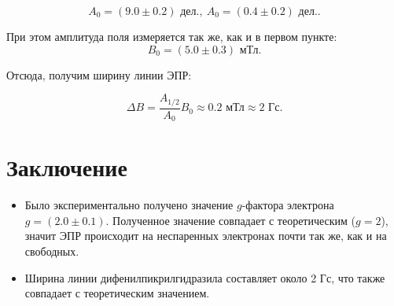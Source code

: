 \documentclass[a4paper, 12pt]{article}
\begin{document}
    $$
    A_0 = \left( 9.0 \pm 0.2 \right) \text{ дел.}, \: A_0 = \left( 0.4 \pm 0.2 \right) \text{ дел.}.
    $$
    
    При этом амплитуда поля измеряется так же, как и в первом пункте: 
    $$
    B_0 = \left(5.0 \pm 0.3 \right) \text{ мТл}.
    $$

    Отсюда, получим ширину линии ЭПР:

    $$
    \Delta B = \frac{A_{1/2}}{A_0} B_0 \approx 0.2 \text{ мТл} \approx 2 \text{ Гс}.
    $$
    
    \section{Заключение}
    
    \begin{itemize}
        \item Было экспериментально получено значение $g$-фактора электрона $g = \left( 2.0 \pm 0.1 \right)$. Полученное значение совпадает с теоретическим ($g = 2$), значит ЭПР происходит на неспаренных электронах почти так же, как и на свободных.

        \item Ширина линии дифенилпикрилгидразила составляет около 2 Гс, что также совпадает с теоретическим значением.

    \end{itemize}
    
\end{document}
